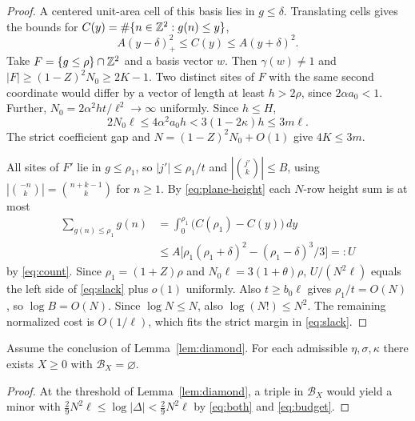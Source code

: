 \begin{proof}
A centered unit-area cell of this basis lies in $g\le\delta$.
Translating cells gives the bounds for $C(y)=\#\{n\in\mathbb Z^2:g(n)\le y\}$,
\begin{equation}\label{eq:count}
           A(y-\delta)_+^2\le C(y)\le A(y+\delta)^2 .
\end{equation}
Take $F=\{g\le\rho\}\cap\mathbb Z^2$ and a basis vector $w$. Then
$\gamma(w)\ne1$ and $|F|\ge(1-Z)^2N_0\ge2K-1$.
Two distinct sites of $F$ with the same second coordinate would differ
by a vector of length at least $h>2\rho$, since $2\alpha a_0<1$.
Further, $N_0=2\alpha^2ht/\ell^2\to\infty$ uniformly. Since $h\le H$,
\[
 2N_0\ell\le4\alpha^2a_0 h<3(1-2\kappa)h\le3m\ell .
\]
The strict coefficient gap and $N=(1-Z)^2N_0+O(1)$ give $4K\le3m$.

All sites of $F'$ lie in $g\le\rho_1$, so $|j'|\le\rho_1/t$ and
$|\binom{j'}k|\le B$, using $|\binom{-n}k|=\binom{n+k-1}k$ for $n\ge1$.
By \eqref{eq:plane-height} each $N$-row height sum is at most
\[
 \begin{aligned}
 \sum_{g(n)\le\rho_1}g(n)
 &=\int_0^{\rho_1}\bigl(C(\rho_1)-C(y)\bigr)\,dy\\
 &\le A\bigl[\rho_1(\rho_1+\delta)^2-(\rho_1-\delta)^3/3\bigr]=:U
 \end{aligned}
\]
by \eqref{eq:count}. Since $\rho_1=(1+Z)\rho$ and $N_0\ell=3(1+\theta)\rho$,
$U/(N^2\ell)$ equals the left side of \eqref{eq:slack} plus $o(1)$ uniformly.
Also $t\ge b_0\ell$ gives $\rho_1/t=O(N)$, so $\log B=O(N)$.
Since $\log N\le N$, also $\log(N!)\le N^2$. The remaining normalized cost is
$O(1/\ell)$, which fits the strict margin in \eqref{eq:slack}.
\end{proof}

\begin{lemma}\label{lem:empty}
Assume the conclusion of Lemma~\ref{lem:diamond}. For each admissible
$\eta,\sigma,\kappa$ there exists $X\ge0$ with $\mathcal B_X=\varnothing$.
\end{lemma}
\begin{proof}
At the threshold of Lemma~\ref{lem:diamond}, a triple in $\mathcal B_X$
would yield a minor with $\tfrac29N^2\ell\le\log|\Delta|<\tfrac29N^2\ell$
by \eqref{eq:both} and \eqref{eq:budget}.
\end{proof}

